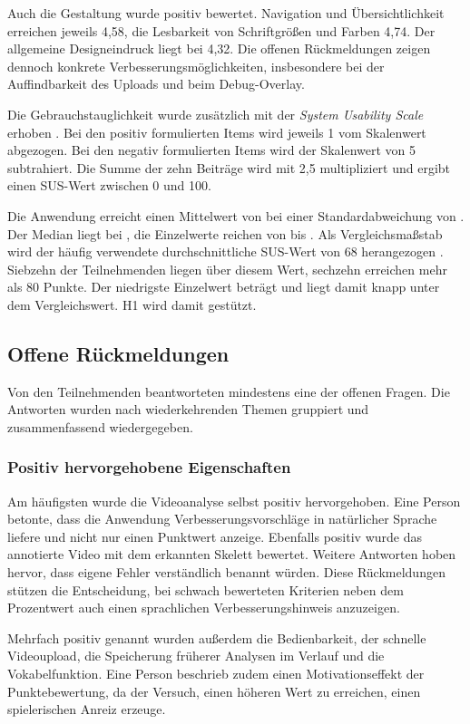 \documentclass[intern]{cgMA}
\begin{document}
Auch die Gestaltung wurde positiv bewertet. Navigation und Übersichtlichkeit erreichen jeweils 4,58, die Lesbarkeit von Schriftgrößen und Farben 4,74. Der allgemeine Designeindruck liegt bei 4,32. Die offenen Rückmeldungen zeigen dennoch konkrete Verbesserungsmöglichkeiten, insbesondere bei der Auffindbarkeit des Uploads und beim Debug-Overlay.

Die Gebrauchstauglichkeit wurde zusätzlich mit der \textit{System Usability Scale} erhoben \cite{Brooke1996}. Bei den positiv formulierten Items wird jeweils 1 vom Skalenwert abgezogen. Bei den negativ formulierten Items wird der Skalenwert von 5 subtrahiert. Die Summe der zehn Beiträge wird mit 2,5 multipliziert und ergibt einen SUS-Wert zwischen 0 und 100.

Die Anwendung erreicht einen Mittelwert von \SUSm{} bei einer Standardabweichung von \SUSsd{}. Der Median liegt bei \SUSmd{}, die Einzelwerte reichen von \SUSmin{} bis \SUSmax{}. Als Vergleichsmaßstab wird der häufig verwendete durchschnittliche SUS-Wert von 68 herangezogen \cite{SauroLewis2016}. Siebzehn der \Nteiln{} Teilnehmenden liegen über diesem Wert, sechzehn erreichen mehr als 80 Punkte. Der niedrigste Einzelwert beträgt \SUSmin{} und liegt damit knapp unter dem Vergleichswert. H1 wird damit gestützt.

\subsection{Offene Rückmeldungen}
\label{sec:eval_freitext}
Von den \Nteiln{} Teilnehmenden beantworteten \Nfreitext{} mindestens eine der offenen Fragen. Die Antworten wurden nach wiederkehrenden Themen gruppiert und zusammenfassend wiedergegeben.

\subsubsection{Positiv hervorgehobene Eigenschaften}
Am häufigsten wurde die Videoanalyse selbst positiv hervorgehoben. Eine Person betonte, dass die Anwendung Verbesserungsvorschläge in natürlicher Sprache liefere und nicht nur einen Punktwert anzeige. Ebenfalls positiv wurde das annotierte Video mit dem erkannten Skelett bewertet. Weitere Antworten hoben hervor, dass eigene Fehler verständlich benannt würden. Diese Rückmeldungen stützen die Entscheidung, bei schwach bewerteten Kriterien neben dem Prozentwert auch einen sprachlichen Verbesserungshinweis anzuzeigen.

Mehrfach positiv genannt wurden außerdem die Bedienbarkeit, der schnelle Videoupload, die Speicherung früherer Analysen im Verlauf und die Vokabelfunktion. Eine Person beschrieb zudem einen Motivationseffekt der Punktebewertung, da der Versuch, einen höheren Wert zu erreichen, einen spielerischen Anreiz erzeuge.
\end{document}

